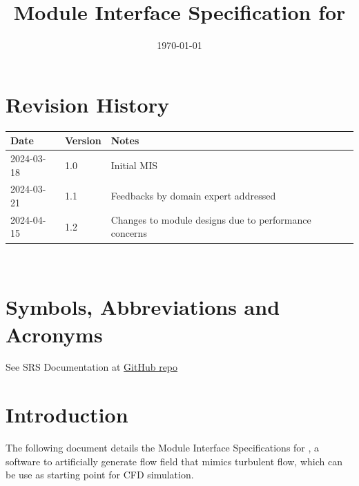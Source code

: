 \documentclass[12pt, titlepage]{article}
\begin{document}
\title{Module Interface Specification for \progname{}}

\author{\authname}

\date{\today}

\maketitle


\section{Revision History}

\begin{tabularx}{\textwidth}{p{3cm}p{2cm}X}
\toprule {\bf Date} & {\bf Version} & {\bf Notes}\\
\midrule
2024-03-18 & 1.0 & Initial MIS\\
2024-03-21 & 1.1 & Feedbacks by domain expert addressed\\
2024-04-15 & 1.2 & Changes to module designs due to performance concerns\\
\bottomrule
\end{tabularx}

~\newpage

\section{Symbols, Abbreviations and Acronyms}

See SRS Documentation at \href{https://github.com/omltcat/turbulent-flow/blob/main/docs/SRS/SRS.pdf}{GitHub repo}


\newpage

\tableofcontents

\newpage


\section{Introduction}

The following document details the Module Interface Specifications for \progname{}, a software to artificially generate flow field that mimics turbulent flow, which can be use as starting point for CFD simulation.
\end{document}
